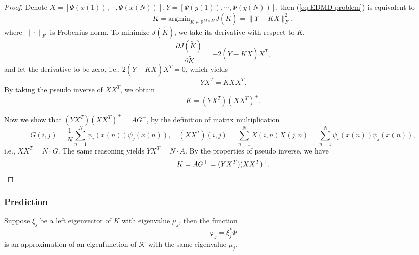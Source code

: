 \documentclass[en, bibend=bibtex]{elegantpaper}
\theoremstyle{plain}
\begin{document}
\begin{proof}
  Denote $X = [\Psi(x(1)),\cdots,\Psi(x(N))], Y =
  [\Psi(y(1)),\cdots,\Psi(y(N))]$,
  then (\ref{eq:EDMD-problem}) is equivalent to
  \begin{equation*}
    K = \text{argmin}_{\tilde{K} \in \mathbb{R}^{M \times M}} J(\tilde{K})
    = \|Y - \tilde{K}X\|_F^2,
  \end{equation*}
  where $\|\cdot\|_F$ is Frobenius norm.
  To minimize $J(\tilde{K})$, we take its derivative with respect to $\tilde{K}$,
  \begin{equation*}
    \frac{\partial J(\tilde{K})}{\partial \tilde{K}}
    = - 2(Y - \tilde{K}X)X^T,
  \end{equation*}
  and let the derivative to be zero, i.e.,
  $2(Y-\tilde{K}X)X^T = 0$,
  which yields
  \begin{equation*}
    YX^T = \tilde{K}XX^T.
  \end{equation*}
  By taking the pseudo inverse of $XX^T$,
  we obtain
  \begin{equation*}
    K = (YX^T)(XX^T)^+.
  \end{equation*}

  Now we show that $(YX^T)(XX^T)^+ = AG^+$,
  by the definition of matrix multiplication
  \begin{equation*}
    G(i,j) = \frac{1}{N} \sum\limits_{n = 1}^N \psi_i(x(n))\psi_j(x(n)), \quad
    (XX^T)(i,j) = \sum\limits_{n = 1}^N X(i,n)X(j,n) = \sum\limits_{n = 1}^N \psi_i(x(n))\psi_j(x(n)),
  \end{equation*}
  i.e., $XX^T = N \cdot G$.
  The same reasoning yields $YX^T = N \cdot A$.
  By the properties of pseudo inverse,
  we have
  \begin{equation*}
    K = AG^+ = (YX^T)(XX^T)^+. \qedhere
  \end{equation*}
\end{proof}

\subsubsection{Prediction}


\begin{proposition}
  Suppose $\xi_j$ be a left eigenvector of $K$ with eigenvalue $\mu_j$,
  then the function
  \begin{equation}
    \label{eq:expression-of-eigenfunction}
    \varphi_j = \xi_j^\ast \Psi
  \end{equation}
  is an approximation of an eigenfunction of $\mathcal{K}$
  with the same eigenvalue $\mu_j$.
\end{proposition}
\end{document}
